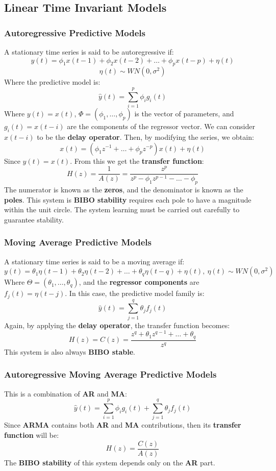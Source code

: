 \documentclass{article}
\begin{document}
\subsection{Linear Time Invariant Models}
\subsubsection{Autoregressive Predictive Models}
A stationary time series is said to be autoregressive if:
\[ y(t) = \phi_1 x(t-1) + \phi_2x(t-2) + \dots + \phi_px(t-p) + \eta(t) \]
\[ \eta(t) \sim WN(0, \sigma^2) \]
Where the predictive model is:
\[ \hat y (t) = \displaystyle\sum^p_{i = 1} \phi_ig_i(t) \]
Where $y(t) = x(t)$, $\Phi = (\phi_1, \dots, \phi_p)$ is the vector of parameters, and $g_i(t) = x(t - i)$ are the components of the regressor vector. We can consider $x(t-i)$ to be the \textbf{delay operator}. Then, by modifying the series, we obtain:
\[ x(t) = (\phi_1 z^{-1} + \dots + \phi_p z^{-p})x(t) + \eta(t) \]
Since $y(t) = x(t)$. From this we get the \textbf{transfer function}:
\[ H(z) = \displaystyle\frac{1}{A(z)} = \frac{z^p}{z^p - \phi_1 z^{p-1} - \dots - \phi_p} \]
The numerator is known as the \textbf{zeros}, and the denominator is known as the \textbf{poles}. This system is \textbf{BIBO stability} requires each pole to have a magnitude within the unit circle. The system learning must be carried out carefully to guarantee stability.

\subsubsection{Moving Average Predictive Models}
A stationary time series is said to be a moving average if:
\[ y(t) = \theta_1\eta(t-1) + \theta_2\eta(t-2) + \dots + \theta_q\eta(t-q) + \eta(t), ~ \eta(t) \sim WN(0, \sigma^2) \]
Where $\Theta = (\theta_1, \dots, \theta_q)$, and the \textbf{regressor components} are $f_j(t) = \eta(t-j)$. In this case, the predictive model family is:
\[ \hat y(t) = \displaystyle\sum^q_{j=1} \theta_j f_j(t) \]
Again, by applying the \textbf{delay operator}, the transfer function becomes:
\[ H(z) = C(z) = \displaystyle\frac{z^q + \theta_1 z^{q-1}+\dots+\theta_q}{z^q} \]
This system is also always \textbf{BIBO stable}.

\subsubsection{Autoregressive Moving Average Predictive Models}
This is a combination of \textbf{AR} and \textbf{MA}:
\[ \hat y (t) = \displaystyle\sum^p_{i = 1} \phi_ig_i(t) + \displaystyle\sum^q_{j=1} \theta_j f_j(t) \]
Since \textbf{ARMA} contains both \textbf{AR} and \textbf{MA} contributions, then its \textbf{transfer function} will be:
\[ H(z) = \displaystyle\frac{C(z)}{A(z)} \]
The \textbf{BIBO stability} of this system depends only on the \textbf{AR} part.
\end{document}
